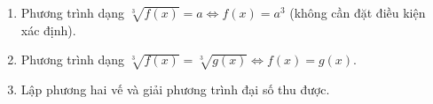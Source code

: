 \begin{enumerate}
\item Phương trình dạng $\sqrt[3]{f(x)} = a \iff \boxed{f(x) = a^3}$ (không cần đặt điều kiện xác định).
\item Phương trình dạng $\sqrt[3]{f(x)} = \sqrt[3]{g(x)} \iff \boxed{f(x) = g(x)}$.
\item Lập phương hai vế và giải phương trình đại số thu được.
\end{enumerate}
